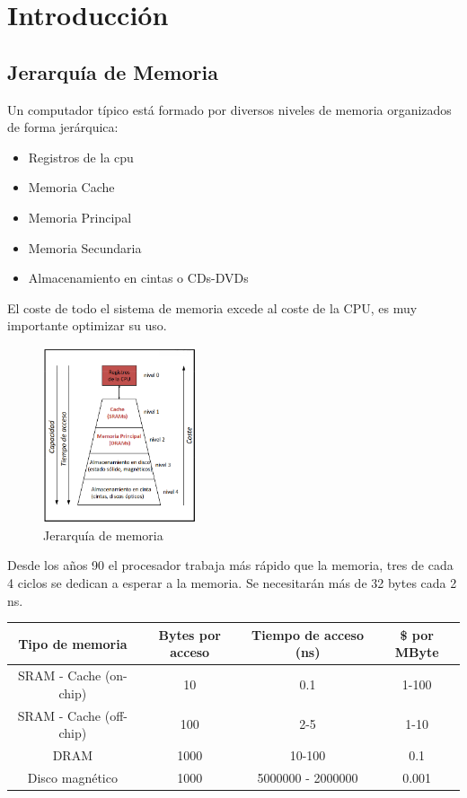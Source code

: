 \section{Introducción}
\subsection{Jerarquía de Memoria}
\begin{multicols}{2}
	Un computador típico está formado por diversos niveles de memoria organizados de forma jerárquica:
	\begin{itemize}
		\item Registros de la \gls{cpu}
		\item Memoria Cache
		\item Memoria Principal
		\item Memoria Secundaria
		\item Almacenamiento en cintas o CDs-DVDs
	\end{itemize}
	El coste de todo el sistema de memoria excede al coste de la CPU, es muy importante optimizar su uso.
	\vfill
	\null
	\begin{figure}[H]
		\centering
		\includegraphics[width=0.4\textwidth]{images/Tema_5/Jerarquia_Memoria.PNG}
		\caption{Jerarquía de memoria}
	\end{figure}
\end{multicols}


Desde los años 90 el procesador trabaja más rápido que la memoria, tres de cada 4 ciclos se dedican a esperar a la memoria. Se necesitarán  más de 32 bytes cada 2 ns.

\begin{table}[H]
	\centering
	\begin{tabular}{|c|c|c|c|}
		\hline
		\textbf{Tipo de memoria} & \textbf{Bytes por acceso} & \textbf{Tiempo de acceso (ns)} & \$ por MByte \\
		\hline
		SRAM - Cache (on-chip)   & 10                        & 0.1                            & 1-100        \\
		\hline
		SRAM - Cache (off-chip)  & 100                       & 2-5                            & 1-10         \\
		\hline
		DRAM                     & 1000                      & 10-100                         & 0.1          \\
		\hline
		Disco magnético          & 1000                      & 5000000 - 2000000              & 0.001        \\
		\hline
	\end{tabular}
\end{table}

